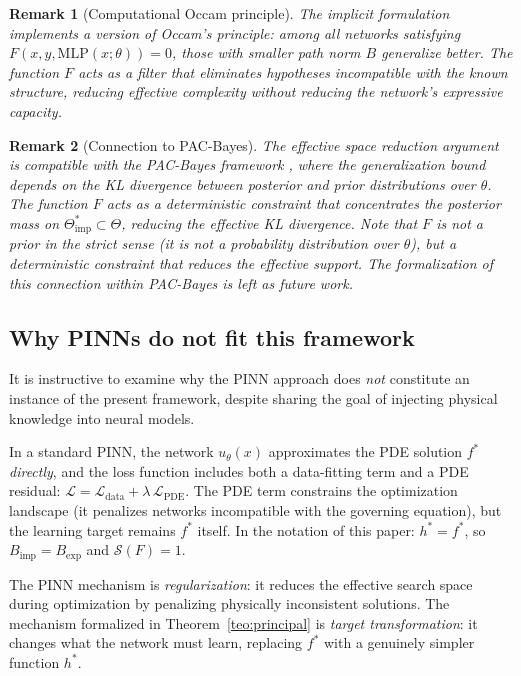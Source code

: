 \documentclass[12pt]{article}
\newtheorem{remark}{Remark}
\newcommand{\MLP}{\mathrm{MLP}}
\begin{document}
\begin{remark}[Computational Occam principle]
The implicit formulation implements a version of Occam's principle:
among all networks satisfying
$F(x, y, \MLP(x;\theta)) = 0$, those with smaller path norm $B$
generalize better.
The function $F$ acts as a filter that eliminates hypotheses
incompatible with the known structure, reducing effective complexity
without reducing the network's expressive capacity.
\end{remark}

\begin{remark}[Connection to PAC-Bayes]
The effective space reduction argument is compatible with the
PAC-Bayes framework \cite{McAllester1999}, where the generalization
bound depends on the KL divergence between posterior and prior
distributions over $\theta$.
The function $F$ acts as a deterministic constraint that concentrates
the posterior mass on
$\Theta^*_{\mathrm{imp}} \subset \Theta$, reducing the effective KL
divergence.
Note that $F$ is not a prior in the strict sense (it is not a
probability distribution over $\theta$), but a deterministic
constraint that reduces the effective support.
The formalization of this connection within PAC-Bayes is left as
future work.
\end{remark}

\subsection{Why PINNs do not fit this framework}
\label{sec:why_not_pinns}

It is instructive to examine why the PINN approach
\cite{Raissi2019} does \emph{not} constitute an instance of the
present framework, despite sharing the goal of injecting physical
knowledge into neural models.

In a standard PINN, the network $u_\theta(x)$ approximates the PDE
solution $f^*$ \emph{directly}, and the loss function includes both
a data-fitting term and a PDE residual:
$\mathcal{L} = \mathcal{L}_{\mathrm{data}} +
\lambda\,\mathcal{L}_{\mathrm{PDE}}$.
The PDE term constrains the optimization landscape (it penalizes
networks incompatible with the governing equation), but the learning
target remains $f^*$ itself.
In the notation of this paper: $h^* = f^*$, so
$B_{\mathrm{imp}} = B_{\mathrm{exp}}$ and $\mathcal{S}(F) = 1$.

The PINN mechanism is \emph{regularization}: it reduces the
effective search space during optimization by penalizing physically
inconsistent solutions.
The mechanism formalized in Theorem~\ref{teo:principal} is
\emph{target transformation}: it changes what the network must
learn, replacing $f^*$ with a genuinely simpler function $h^*$.
\end{document}
